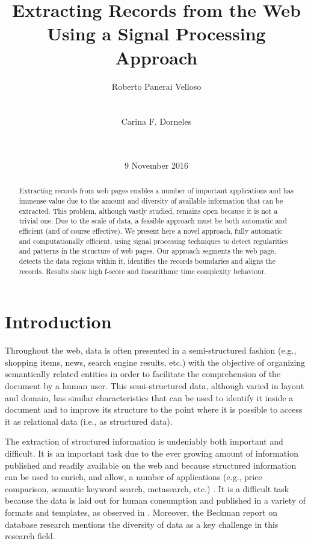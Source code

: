 \documentclass{vldb}
\title{Extracting Records from the Web Using a Signal Processing Approach}
\author{
\alignauthor
Roberto Panerai Velloso\\
       \affaddr{Universidade Federal de Santa Catarina}\\
       \affaddr{Florianópolis (SC), Brazil}\\
       \email{rvelloso@gmail.com}
\alignauthor
Carina F. Dorneles\\
       \affaddr{Universidade Federal de Santa Catarina}\\
       \affaddr{Florianópolis (SC), Brazil}\\
       \email{dorneles@inf.ufsc.br}
}
\date{9 November 2016}
\begin{document}

\maketitle

\begin{abstract}
Extracting records from web pages enables a number of important
applications and has immense value due to the amount and diversity of
available information that can be extracted. This problem, although vastly
studied, remains open because it is not a trivial one. Due to the scale of data,
a feasible approach must be both automatic and efficient (and of course
effective). We present here a novel approach, fully automatic and
computationally efficient, using signal processing techniques to detect
regularities and patterns in the structure of web pages. Our approach segments
the web page, detects the data regions within it, identifies the records
boundaries and aligns the records. Results show high f-score and
linearithmic time complexity behaviour.
\end{abstract}

\section{Introduction}

Throughout the web, data is often presented in a semi-structured fashion (e.g.,
shopping items, news, search engine results, etc.) with the objective of
organizing semantically related entities in order to facilitate the
comprehension of the document by a human user. This semi-structured data,
although varied in layout and domain, has similar characteristics that can be
used to identify it inside a document and to improve its structure to the point
where it is possible to access it as relational data (i.e., as structured data).

The extraction of structured information is undeniably both
important and difficult. It is an important task due to the ever growing amount
of information published and readily available on the web and because
structured information can be used to enrich, and allow, a number of
applications (e.g., price comparison, semantic keyword search, metasearch,
etc.) \cite{relationalWeb2008,kalyanpur2012structured,2015webtables}.
It is a difficult task because the data is laid out for human consumption and
published in a variety of formats and templates, as observed in
\cite{structured2011}. Moreover, the Beckman report on database
research\cite{abadi2014beckman} mentions the diversity of data as a key
challenge in this research field.
\end{document}
